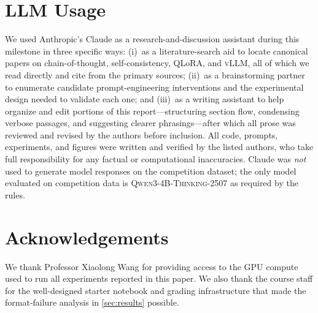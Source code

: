 \documentclass{article}
\begin{document}
\section*{LLM Usage}
We used Anthropic's Claude as a research-and-discussion assistant
during this milestone in three specific ways:
(i)~as a literature-search aid to locate canonical papers on
chain-of-thought, self-consistency, QLoRA, and \textsc{vLLM}, all of
which we read directly and cite from the primary sources;
(ii)~as a brainstorming partner to enumerate candidate
prompt-engineering interventions and the experimental design needed to
validate each one; and
(iii)~as a writing assistant to help organize and edit portions of
this report—structuring section flow, condensing verbose passages, and
suggesting clearer phrasings—after which all prose was reviewed and
revised by the authors before inclusion. All code, prompts,
experiments, and figures were written and verified by the listed
authors, who take full responsibility for any factual or computational
inaccuracies. Claude was \emph{not} used to generate model responses
on the competition dataset; the only model evaluated on competition
data is \textsc{Qwen3-4B-Thinking-2507} as required by the rules.


\section*{Acknowledgements}
We thank Professor Xiaolong Wang for providing access to the GPU
compute used to run all experiments reported in this paper. We also
thank the course staff for the well-designed starter notebook and
grading infrastructure that made the format-failure analysis in
\cref{sec:results} possible.



\end{document}
